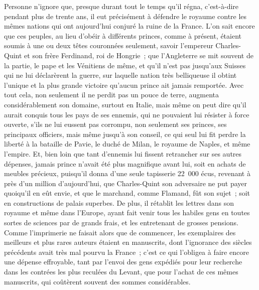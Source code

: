 \documentclass[french,twoside]{book} %
\begin{document}
Personne n’ignore que, presque durant tout le temps qu’il régna, c’est-à-dire pendant plus de trente ans, il eut précisément à défendre le royaume contre les mêmes nations qui ont aujourd’hui conjuré la ruine de la France. L’on sait encore que ces peuples, au lieu d’obéir à différents princes, comme à présent, étaient soumis à une ou deux têtes couronnées seulement, savoir l’empereur Charles-Quint et son frère Ferdinand, roi de Hongrie ; que l’Angleterre se mit souvent de la partie, le pape et les Vénitiens de même, et qu’il n’est pas jusqu’aux Suisses qui ne lui déclarèrent la guerre, sur laquelle nation très belliqueuse il obtint l’unique et la plus grande victoire qu’aucun prince ait jamais remportée. Avec tout cela, non seulement il ne perdit pas un pouce de terre, augmenta considérablement son domaine, surtout en Italie, mais même on peut dire qu’il aurait conquis tous les pays de ses ennemis, qui ne pouvaient lui résister à force ouverte, s’ils ne lui eussent pas corrompu, non seulement ses princes, ses principaux officiers, mais même jusqu’à son conseil, ce qui seul lui fit perdre la liberté à la bataille de Pavie, le duché de Milan, le royaume de Naples, et même l’empire. Et, bien loin que tant d’ennemis lui fissent retrancher sur ses autres dépenses, jamais prince n’avait été plus magnifique avant lui, soit en achats de meubles précieux, puisqu’il donna d’une seule tapisserie 22 000 écus, revenant à près d’un million d’aujourd’hui, que Charles-Quint son adversaire ne put payer quoiqu’il en eût envie, et que le marchand, comme Flamand, fût son sujet ; soit en constructions de palais superbes. De plus, il rétablit les lettres dans son royaume et même dans l’Europe, ayant fait venir tous les habiles gens en toutes sortes de sciences par de grands frais, et les entretenant de grosses pensions. Comme l’imprimerie ne faisait alors que de commencer, les exemplaires des meilleurs et plus rares auteurs étaient en manuscrits, dont l’ignorance des siècles précédents avait très mal pourvu la France ; c’est ce qui l’obligea à faire encore une dépense effroyable, tant par l’envoi des gens expédiés pour leur recherche dans les contrées les plus reculées du Levant, que pour l’achat de ces mêmes manuscrits, qui coûtèrent souvent des sommes considérables.\par
\end{document}
